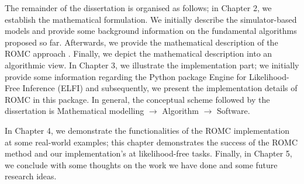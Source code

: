 The remainder of the dissertation is organised as follows; in Chapter
2, we establish the mathematical formulation. We initially describe
the simulator-based models and provide some background information on
the fundamental algorithms proposed so far. Afterwards, we provide the
mathematical description of the ROMC approach
\autocite{Ikonomov2019}. Finally, we depict the mathematical
description into an algorithmic view. In Chapter 3, we illustrate the
implementation part; we initially provide some information regarding
the Python package Engine for Likelihood-Free Inference (ELFI)
\autocite{1708.00707} and subsequently, we present the implementation
details of ROMC in this package. In general, the conceptual scheme
followed by the dissertation is Mathematical modelling $\rightarrow$
Algorithm $\rightarrow$ Software.

In Chapter 4, we demonstrate the functionalities of the ROMC
implementation at some real-world examples; this chapter demonstrates
the success of the ROMC method and our implementation's at
likelihood-free tasks. Finally, in Chapter 5, we conclude with some
thoughts on the work we have done and some future research ideas.